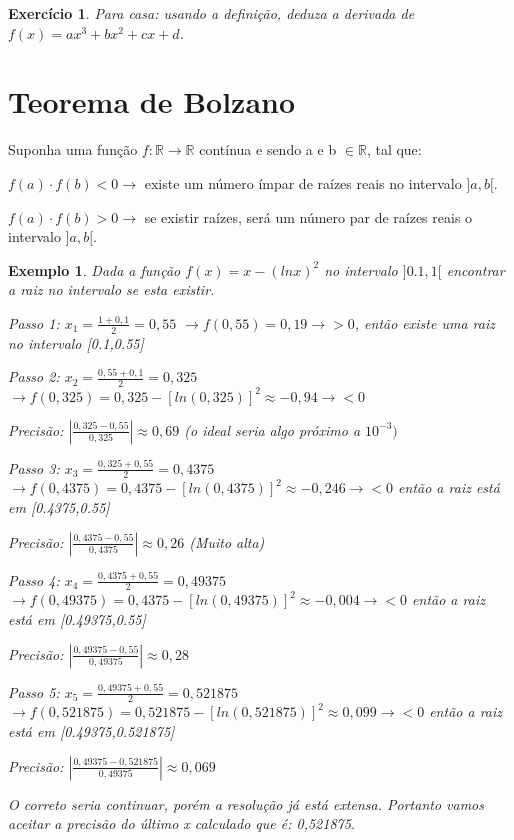 \documentclass{book}
\numberwithin{defn}{chapter}
\newtheorem{exe}{Exemplo}
\numberwithin{exe}{chapter}
\newtheorem{ex}{Exercício}
\numberwithin{ex}{chapter}
\numberwithin{obs}{chapter}
\numberwithin{fato}{chapter}
\numberwithin{resp}{chapter}
\begin{document}
\begin{ex}
    Para casa: usando a definição, deduza a derivada de $f(x)=ax^3+bx^2+cx+d$.
\end{ex}

\section{Teorema de Bolzano} 

Suponha uma função $f:\mathbb{R}\to\mathbb{R}$ contínua e sendo a e b $\in \mathbb{R}$, tal que:

$f(a)\cdot f(b)<0 \to$ existe um número ímpar de raízes reais no intervalo $]a,b[$. 
 
$f(a)\cdot f(b)>0 \to$ se existir raízes, será um número par de raízes reais o intervalo $]a,b[$. 

\begin{exe}
    Dada a função $f(x)=x-(lnx)^2$ no intervalo $]0.1,1[$ encontrar a raiz no intervalo se esta existir.

\item Passo 1: $x_1=\frac{1+0,1}{2}=0,55$ $\to f(0,55)=0,19 \to >0$, então existe uma raiz no intervalo [0.1,0.55]

\item Passo 2: $x_2=\frac{0,55+0,1}{2}=0,325$ $\to f(0,325)=0,325-[ln(0,325)]^2\approx -0,94 \to <0$
\item Precisão: $\left| \frac{0,325-0,55}{0,325} \right| \approx 0,69$ (o ideal seria algo próximo a $10^{-3})$

\item Passo 3: $x_3=\frac{0,325+0,55}{2}=0,4375$ $\to f(0,4375)=0,4375-[ln(0,4375)]^2\approx -0,246 \to <0$ então a raiz está em [0.4375,0.55]
\item Precisão: $\left| \frac{0,4375-0,55}{0,4375} \right| \approx 0,26$ (Muito alta)

\item Passo 4: $x_4=\frac{0,4375+0,55}{2}=0,49375$ $\to f(0,49375)=0,4375-[ln(0,49375)]^2\approx -0,004 \to <0$ então a raiz está em [0.49375,0.55]
\item Precisão: $\left| \frac{0,49375-0,55}{0,49375} \right| \approx 0,28$

\item Passo 5: $x_5=\frac{0,49375+0,55}{2}=0,521875$ $\to f(0,521875)=0,521875-[ln(0,521875)]^2\approx 0,099 \to <0$ então a raiz está em [0.49375,0.521875]
\item Precisão: $\left| \frac{0,49375-0,521875}{0,49375} \right| \approx 0,069$

\item O correto seria continuar, porém a resolução já está extensa. Portanto vamos aceitar a precisão do último x calculado que é: 0,521875.
\end{exe}
\end{document}
